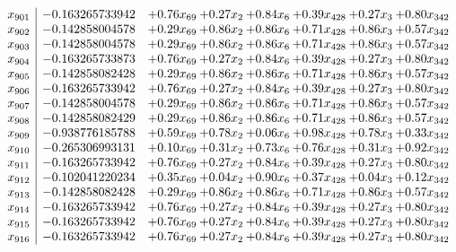 \documentclass[8pt]{article}
\begin{document}
\[\begin{array}{c| c c@{\hskip 2pt} c@{\hskip 2pt} c@{\hskip 2pt} c@{\hskip 2pt} c@{\hskip 2pt} c@{\hskip 2pt} }
 x_{901}   &  -0.163265733942 & +  0.76 x_{69} & +  0.27 x_{2} & +  0.84 x_{6} & +  0.39 x_{428} & +  0.27 x_{3} & +  0.80 x_{342}\\
 x_{902}   &  -0.142858004578 & +  0.29 x_{69} & +  0.86 x_{2} & +  0.86 x_{6} & +  0.71 x_{428} & +  0.86 x_{3} & +  0.57 x_{342}\\
 x_{903}   &  -0.142858004578 & +  0.29 x_{69} & +  0.86 x_{2} & +  0.86 x_{6} & +  0.71 x_{428} & +  0.86 x_{3} & +  0.57 x_{342}\\
 x_{904}   &  -0.163265733873 & +  0.76 x_{69} & +  0.27 x_{2} & +  0.84 x_{6} & +  0.39 x_{428} & +  0.27 x_{3} & +  0.80 x_{342}\\
 x_{905}   &  -0.142858082428 & +  0.29 x_{69} & +  0.86 x_{2} & +  0.86 x_{6} & +  0.71 x_{428} & +  0.86 x_{3} & +  0.57 x_{342}\\
 x_{906}   &  -0.163265733942 & +  0.76 x_{69} & +  0.27 x_{2} & +  0.84 x_{6} & +  0.39 x_{428} & +  0.27 x_{3} & +  0.80 x_{342}\\
 x_{907}   &  -0.142858004578 & +  0.29 x_{69} & +  0.86 x_{2} & +  0.86 x_{6} & +  0.71 x_{428} & +  0.86 x_{3} & +  0.57 x_{342}\\
 x_{908}   &  -0.142858082429 & +  0.29 x_{69} & +  0.86 x_{2} & +  0.86 x_{6} & +  0.71 x_{428} & +  0.86 x_{3} & +  0.57 x_{342}\\
 x_{909}   &  -0.938776185788 & +  0.59 x_{69} & +  0.78 x_{2} & +  0.06 x_{6} & +  0.98 x_{428} & +  0.78 x_{3} & +  0.33 x_{342}\\
 x_{910}   &  -0.265306993131 & +  0.10 x_{69} & +  0.31 x_{2} & +  0.73 x_{6} & +  0.76 x_{428} & +  0.31 x_{3} & +  0.92 x_{342}\\
 x_{911}   &  -0.163265733942 & +  0.76 x_{69} & +  0.27 x_{2} & +  0.84 x_{6} & +  0.39 x_{428} & +  0.27 x_{3} & +  0.80 x_{342}\\
 x_{912}   &  -0.102041220234 & +  0.35 x_{69} & +  0.04 x_{2} & +  0.90 x_{6} & +  0.37 x_{428} & +  0.04 x_{3} & +  0.12 x_{342}\\
 x_{913}   &  -0.142858082428 & +  0.29 x_{69} & +  0.86 x_{2} & +  0.86 x_{6} & +  0.71 x_{428} & +  0.86 x_{3} & +  0.57 x_{342}\\
 x_{914}   &  -0.163265733942 & +  0.76 x_{69} & +  0.27 x_{2} & +  0.84 x_{6} & +  0.39 x_{428} & +  0.27 x_{3} & +  0.80 x_{342}\\
 x_{915}   &  -0.163265733942 & +  0.76 x_{69} & +  0.27 x_{2} & +  0.84 x_{6} & +  0.39 x_{428} & +  0.27 x_{3} & +  0.80 x_{342}\\
 x_{916}   &  -0.163265733942 & +  0.76 x_{69} & +  0.27 x_{2} & +  0.84 x_{6} & +  0.39 x_{428} & +  0.27 x_{3} & +  0.80 x_{342}\\

\end{array}\]
\end{document}
